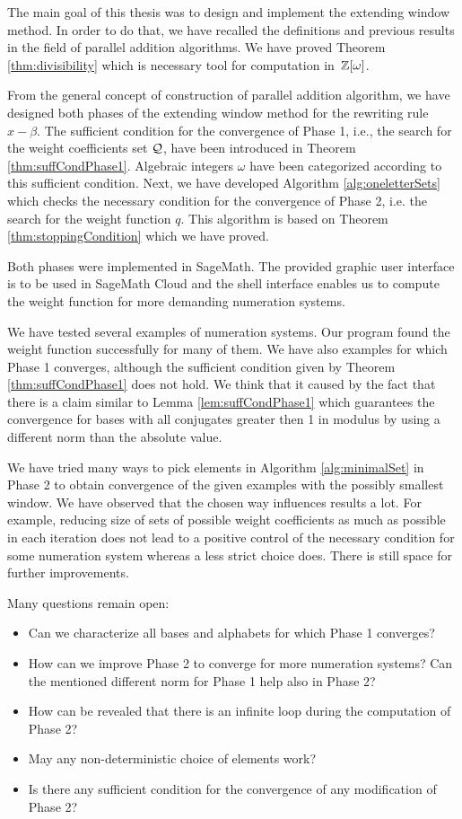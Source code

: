 The main goal of this thesis was to design and implement the extending window method. In order to do that, we have recalled the definitions and previous results in the field of parallel addition algorithms. We have proved Theorem \ref{thm:divisibility} which is necessary tool for computation in~$\mathbb{Z}[\omega]$.

From the general concept of construction of parallel addition algorithm, we have designed both phases of the extending window method for the rewriting rule $x-\beta$. The sufficient condition for the convergence of Phase 1, i.e., the search for the weight coefficients set $\mathcal{Q}$, have been introduced in Theorem \ref{thm:suffCondPhase1}. Algebraic integers $\omega$ have been categorized according to this sufficient condition. Next, we have developed Algorithm \ref{alg:oneletterSets} which checks the necessary condition for the convergence of Phase 2, i.e. the search for the weight function $q$. This algorithm is based on Theorem \ref{thm:stoppingCondition} which we have proved.

Both phases were implemented in SageMath. The provided graphic user interface is  to be used in SageMath Cloud and the shell interface enables us to compute the weight function for more demanding numeration systems.

We have tested several examples of numeration systems. Our program found the weight function successfully for many of them. We have also examples for which Phase 1 converges, although the sufficient condition given by Theorem \ref{thm:suffCondPhase1} does not hold. We think that it caused by the fact that there is a claim similar to Lemma \ref{lem:suffCondPhase1} which guarantees the convergence for bases with all conjugates greater then 1 in modulus by using a different norm than the absolute value.

We have tried many ways to pick elements in Algorithm \ref{alg:minimalSet} in Phase 2 to obtain convergence of the given examples with the possibly smallest window. We have observed that the chosen way influences results a lot. For example, reducing  size of sets of possible weight coefficients as much as possible in each iteration does not lead to a positive control of the necessary condition for some numeration system whereas a less strict choice does. There is still space for further improvements.

Many questions remain open:
\begin{itemize}
\item Can we characterize all bases and alphabets for which Phase 1 converges?
\item How can we improve Phase 2 to converge for more numeration systems? Can the mentioned different norm for Phase 1 help also in Phase 2? 
\item How can be revealed that there is an infinite loop during the computation of Phase 2?
\item May any non-deterministic choice of elements work?
\item Is there any sufficient condition for the convergence of any modification of Phase 2? 
\end{itemize}
